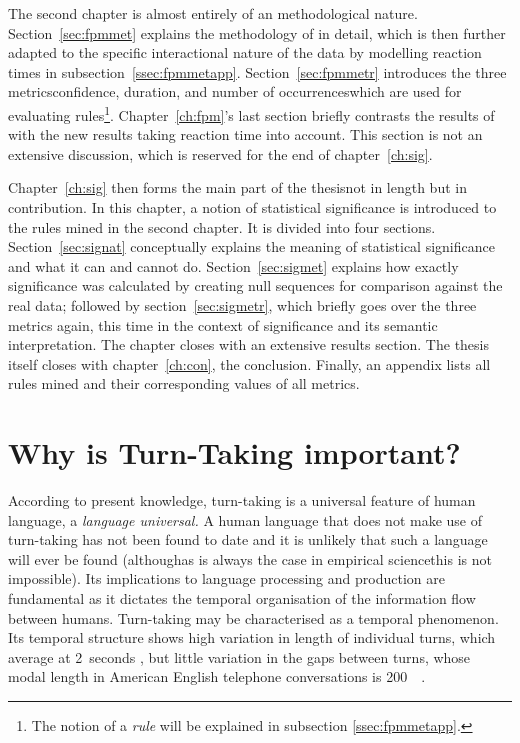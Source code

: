 The second chapter is almost entirely of an methodological nature.
Section~\ref{sec:fpmmet} explains the methodology of \citet{rohlfing_multimodal_underreview} in detail, which is then further adapted to the specific interactional nature of the data by modelling reaction times in subsection~\ref{ssec:fpmmetapp}.
Section~\ref{sec:fpmmetr} introduces the three metrics\dash confidence, duration, and number of occurrences\dash which are used for evaluating rules\footnote{The notion of a \emph{rule} will be explained in subsection \ref{ssec:fpmmetapp}.}.
Chapter~\ref{ch:fpm}'s last section briefly contrasts the results of \citet{rohlfing_multimodal_underreview} with the new results taking reaction time into account.
This section is not an extensive discussion, which is reserved for the end of chapter~\ref{ch:sig}.

Chapter~\ref{ch:sig} then forms the main part of the thesis\dash not in length but in contribution.
In this chapter, a notion of statistical significance is introduced to the rules mined in the second chapter.
It is divided into four sections.
Section~\ref{sec:signat} conceptually explains the meaning of statistical significance and what it can and cannot do.
Section~\ref{sec:sigmet} explains how exactly significance was calculated by creating null sequences for comparison against the real data; followed by section~\ref{sec:sigmetr}, which briefly goes over the three metrics again, this time in the context of significance and its semantic interpretation.
The chapter closes with an extensive results section.
The thesis itself closes with chapter~\ref{ch:con}, the conclusion.
Finally, an appendix lists all rules mined and their corresponding values of all metrics.


\section{Why is Turn-Taking important?}
\label{sec:intrott}
According to present knowledge, turn-taking is a universal feature of human language, a \emph{language universal.}
A human language that does not make use of turn-taking has not been found to date and it is unlikely that such a language will ever be found (although\dash as is always the case in empirical science\dash this is not impossible).
Its implications to language processing and production are fundamental as it dictates the temporal organisation of the information flow between humans.
Turn-taking may be characterised as a temporal phenomenon.
Its temporal structure shows high variation in length of individual turns, which average at 2~seconds \citep[]{levinson_turn-taking_2016}, but little variation in the gaps between turns, whose modal length in American English telephone conversations is 200~\ms\ \citep[]{levinson_timing_2015}.

